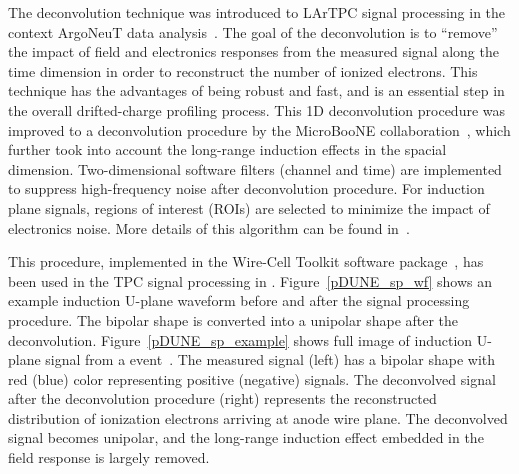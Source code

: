 The deconvolution technique was introduced to LArTPC signal processing in the context ArgoNeuT 
data analysis~\cite{Baller:2017ugz}. The goal of the deconvolution is to ``remove'' the impact of field and 
electronics responses from the measured signal along the time dimension in order to reconstruct the number of ionized
electrons. This technique has the advantages of being robust and fast, and is an essential step in the overall drifted-charge profiling process. This 1D deconvolution procedure was improved to a \twod deconvolution procedure 
by the MicroBooNE collaboration~\cite{Adams:2018dra,Adams:2018gbi}, which further took into account the long-range 
induction effects in the spacial dimension. Two-dimensional software filters (channel and time) are implemented to 
suppress high-frequency noise after deconvolution procedure. For induction plane signals, regions of interest 
(ROIs) are selected to minimize the impact of electronics noise. More details of this algorithm can be found in~\cite{Adams:2018dra}.

This procedure, implemented in the Wire-Cell Toolkit software package~\cite{ref:wire_cell_toolkit},  has been used in the TPC signal processing in . Figure~\ref{pDUNE_sp_wf}
shows an example induction U-plane waveform before and after the signal processing procedure. The bipolar 
shape is converted into a unipolar shape after the \twod deconvolution. Figure~\ref{pDUNE_sp_example}
shows full \twod image of induction U-plane signal from a  
event~\cite{ref:pdune_signal_processing}. The measured signal (left) has a bipolar shape with red (blue) color 
representing positive (negative) signals. The deconvolved signal after 
the \twod deconvolution procedure (right) represents the reconstructed 
distribution of ionization electrons arriving at anode wire plane. The 
deconvolved signal becomes unipolar, and the long-range 
induction effect embedded in the field response is largely removed. 


